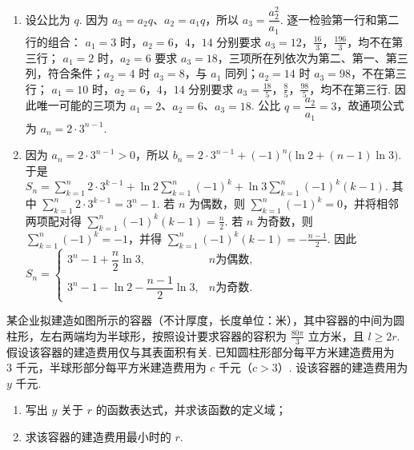 \begin{solution}
\begin{enumerate}
\item 设公比为 \(q\). 因为 \(a_3=a_2q\)、\(a_2=a_1q\)，所以
\(a_3=\dfrac{a_2^2}{a_1}\). 逐一检验第一行和第二行的组合：
\(a_1=3\) 时，\(a_2=6\)，\(4\)，\(14\) 分别要求 \(a_3=12\)，\(\frac{16}{3}\)，\(\frac{196}{3}\)，均不在第三行；
\(a_1=2\) 时，\(a_2=6\) 要求 \(a_3=18\)，三项所在列依次为第二、第一、第三列，符合条件；\(a_2=4\) 时 \(a_3=8\)，与 \(a_1\) 同列；\(a_2=14\) 时 \(a_3=98\)，不在第三行；
\(a_1=10\) 时，\(a_2=6\)，\(4\)，\(14\) 分别要求 \(a_3=\frac{18}{5}\)，\(\frac85\)，\(\frac{98}{5}\)，均不在第三行. 因此唯一可能的三项为 \(a_1=2\)、\(a_2=6\)、\(a_3=18\). 公比
\(q=\dfrac{a_2}{a_1}=3\)，故通项公式为 \(a_n=2\cdot3^{n-1}\).
\item 因为 \(a_n=2\cdot3^{n-1}>0\)，所以
\(b_n=2\cdot3^{n-1}+(-1)^n\bigl(\ln2+(n-1)\ln3\bigr)\). 于是
\(S_n=\sum_{k=1}^n2\cdot3^{k-1}+\ln2\sum_{k=1}^n(-1)^k+\ln3\sum_{k=1}^n(-1)^k(k-1)\).
其中 \(\sum_{k=1}^n2\cdot3^{k-1}=3^n-1\). 若 \(n\) 为偶数，则
\(\sum_{k=1}^n(-1)^k=0\)，并将相邻两项配对得
\(\sum_{k=1}^n(-1)^k(k-1)=\frac n2\). 若 \(n\) 为奇数，则
\(\sum_{k=1}^n(-1)^k=-1\)，并得
\(\sum_{k=1}^n(-1)^k(k-1)=-\frac{n-1}{2}\). 因此
\(S_n=\begin{cases}
3^n-1+\dfrac n2\ln3,&n\text{为偶数},\\
3^n-1-\ln2-\dfrac{n-1}{2}\ln3,&n\text{为奇数}.
\end{cases}\)
\end{enumerate}
\end{solution}

\begin{problem}
某企业拟建造如图所示的容器（不计厚度，长度单位：米），其中容器的中间为圆柱形，左右两端均为半球形，按照设计要求容器的容积为 \(\frac{80\pi}{3}\text{ 立方米}\)，且 \(l\geqslant2r\). 假设该容器的建造费用仅与其表面积有关. 已知圆柱形部分每平方米建造费用为 \(3\text{ 千元}\)，半球形部分每平方米建造费用为 \(c\text{ 千元}\)（\(c>3\)）. 设该容器的建造费用为 \(y\text{ 千元}\).
\begin{enumerate}
\item 写出 \(y\) 关于 \(r\) 的函数表达式，并求该函数的定义域；
\item 求该容器的建造费用最小时的 \(r\).
\end{enumerate}

\end{problem}

